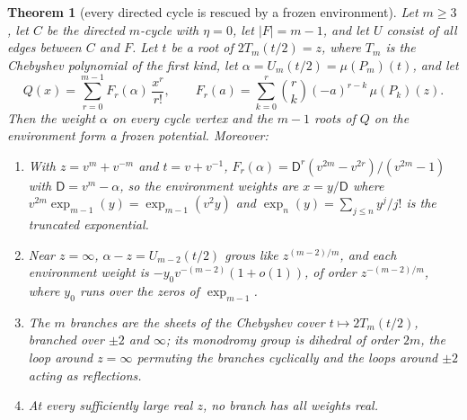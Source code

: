 \documentclass[11pt]{amsart}
\theoremstyle{plain}
\newtheorem{theorem}{Theorem}[section]
\theoremstyle{definition}
\theoremstyle{remark}
\numberwithin{equation}{section}
\begin{document}
\begin{theorem}[every directed cycle is rescued by a frozen environment]\label{thm:every-cycle}
Let $m\ge3$, let $C$ be the directed $m$-cycle with $\eta=0$, let $|F|=m-1$, and let $U$ consist of all edges between $C$ and $F$. Let $t$ be a root of $2T_m(t/2)=z$, where $T_m$ is the Chebyshev polynomial of the first kind, let $\alpha=U_m(t/2)=\mu(P_m)(t)$, and let
\[
Q(x)=\sum_{r=0}^{m-1}F_r(\alpha)\,\frac{x^{r}}{r!},\qquad F_r(a)=\sum_{k=0}^{r}\binom{r}{k}(-a)^{r-k}\,\mu(P_k)(z).
\]
Then the weight $\alpha$ on every cycle vertex and the $m-1$ roots of $Q$ on the environment form a frozen potential. Moreover:
\begin{enumerate}[label=\textup{(\arabic*)}]
\item With $z=v^{m}+v^{-m}$ and $t=v+v^{-1}$, $F_r(\alpha)=\mathsf D^{r}(v^{2m}-v^{2r})/(v^{2m}-1)$ with $\mathsf D=v^{m}-\alpha$, so the environment weights are $x=y/\mathsf D$ where $v^{2m}\exp_{m-1}(y)=\exp_{m-1}(v^{2}y)$ and $\exp_n(y)=\sum_{j\le n}y^{j}/j!$ is the truncated exponential.
\item Near $z=\infty$, $\alpha-z=U_{m-2}(t/2)$ grows like $z^{(m-2)/m}$, and each environment weight is $-y_0v^{-(m-2)}(1+o(1))$, of order $z^{-(m-2)/m}$, where $y_0$ runs over the zeros of $\exp_{m-1}$.
\item The $m$ branches are the sheets of the Chebyshev cover $t\mapsto2T_m(t/2)$, branched over $\pm2$ and $\infty$; its monodromy group is dihedral of order $2m$, the loop around $z=\infty$ permuting the branches cyclically and the loops around $\pm2$ acting as reflections.
\item At every sufficiently large real $z$, no branch has all weights real.
\end{enumerate}
\end{theorem}
\end{document}
